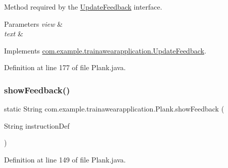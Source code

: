Method required by the \mbox{\hyperlink{interfacecom_1_1example_1_1trainawearapplication_1_1_update_feedback}{Update\+Feedback}} interface. 


\begin{DoxyParams}{Parameters}
{\em view} & \\
\hline
{\em text} & \\
\hline
\end{DoxyParams}


Implements \mbox{\hyperlink{interfacecom_1_1example_1_1trainawearapplication_1_1_update_feedback_a7a026880188b11aca6d8184d57e699e8}{com.\+example.\+trainawearapplication.\+Update\+Feedback}}.



Definition at line 177 of file Plank.\+java.


\begin{DoxyCode}{0}

\end{DoxyCode}
\mbox{\label{classcom_1_1example_1_1trainawearapplication_1_1_plank_a14343873d9ff489757bebbad97adbaf1}} 
\subsubsection{\texorpdfstring{showFeedback()}{showFeedback()}}
{\footnotesize\ttfamily static String com.\+example.\+trainawearapplication.\+Plank.\+show\+Feedback (\begin{DoxyParamCaption}\item[{String}]{instruction\+Def }\end{DoxyParamCaption})\hspace{0.3cm}{\ttfamily [static]}}



Definition at line 149 of file Plank.\+java.


